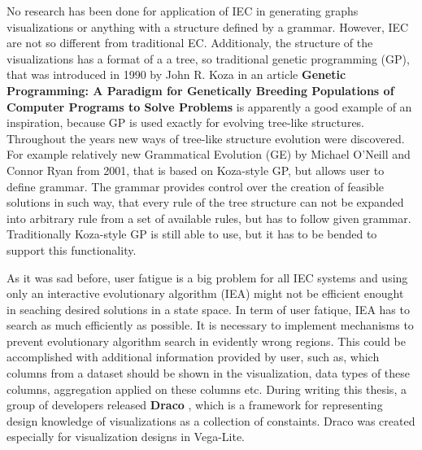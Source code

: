 No research has been done for application of IEC in generating graphs visualizations or anything with a structure defined by a grammar. However, IEC are not so different from traditional EC. Additionaly, the structure of the visualizations has a format of a a tree, so traditional genetic programming (GP), that was introduced in 1990 by John R. Koza in an article \textbf{Genetic Programming: A Paradigm for Genetically Breeding Populations of Computer Programs to Solve Problems} \cite{genetic-programming} is apparently a good example of an inspiration, because GP is used exactly for evolving tree-like structures. Throughout the years new ways of tree-like structure evolution were discovered. For example relatively new Grammatical Evolution (GE) \cite{grammatical-evolution} by Michael O'Neill and Connor Ryan from 2001, that is based on Koza-style GP, but allows user to define grammar. The grammar provides control over the creation of feasible solutions in such way, that every rule of the tree structure can not be expanded into arbitrary rule from a set of available rules, but has to follow given grammar. Traditionally Koza-style GP is still able to use, but it has to be bended to support this functionality.

As it was sad before, user fatigue is a big problem for all IEC systems and using only an interactive evolutionary algorithm (IEA) might not be efficient enought in seaching desired solutions in a state space. In term of user fatique, IEA has to search as much efficiently as possible. It is necessary to implement mechanisms to prevent evolutionary algorithm search in evidently wrong regions. This could be accomplished with additional information provided by user, such as, which columns from a dataset should be shown in the visualization, data types of these columns, aggregation applied on these columns etc. During writing this thesis, a group of developers released \textbf{Draco} \cite{draco}, which is a framework for representing design knowledge of visualizations as a collection of constaints. Draco was created especially for visualization designs in Vega-Lite.
